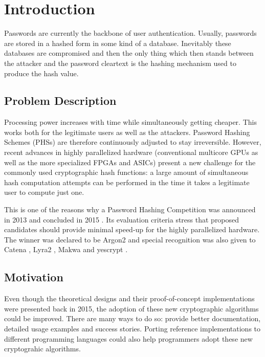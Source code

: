 \chapter{Introduction}
\label{sec:introduction}
Passwords are currently the backbone of user authentication. Usually, passwords are stored in a hashed form in some kind of a database. Inevitably these databases are compromised and then the only thing which then stands between the attacker and the password cleartext is the hashing mechanism used to produce the hash value.

\section{Problem Description}
Processing power increases with time while simultaneously getting cheaper. This works both for the legitimate users as well as the attackers. Password Hashing Schemes (PHSs) are therefore continuously adjusted to stay irreversible. However, recent advances in highly parallelized hardware (conventional multicore GPUs as well as the more specialized FPGAs and ASICs) present a new challenge for the commonly used cryptographic hash functions: a large amount of simultaneous hash computation attempts can be performed in the time it takes a legitimate user to compute just one.

This is one of the reasons why a Password Hashing Competition was announced in 2013 and concluded in 2015 \cite{wetzels:2016:phc}. Its evaluation criteria stress that proposed candidates should provide minimal speed-up for the highly parallelized hardware. The winner was declared to be Argon2 \cite{biryukov:2015:argon2} and special recognition was also given to Catena \cite{forler:2013:catena}, Lyra2 \cite{andrade:2016:lyra2,marcos:2015:lyra2}, Makwa \cite{pornin:2015:makwa} and yescrypt \cite{peslyak:2015:yescrypt}.

\section{Motivation}
Even though the theoretical designs and their proof-of-concept implementations were presented back in 2015, the adoption of these new cryptographic algorithms could be improved. There are many ways to do so: provide better documentation, detailed usage examples and success stories. Porting reference implementations to different programming languages could also help programmers adopt these new cryptograhic algorithms.

